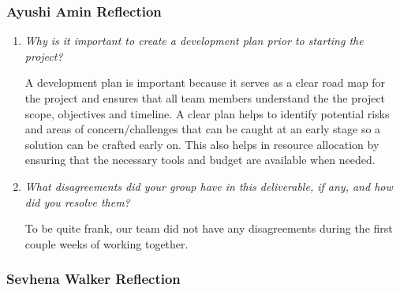 \documentclass{article}
\begin{document}
\subsubsection*{Ayushi Amin Reflection}

\begin{enumerate}
  \item \textit{Why is it important to create a development plan prior to starting the
    project?}

    A development plan is important because it serves as a clear road map for the project and ensures that all 
    team members understand the the project scope, objectives and timeline. A clear plan helps to identify potential risks
    and areas of concern/challenges that can be caught at an early stage so a solution can be crafted early on. This also helps
    in resource allocation by ensuring that the necessary tools and budget are available when needed.

  \item \textit{What disagreements did your group have in this deliverable, if any, and how did you resolve them?}

    To be quite frank, our team did not have any disagreements during the first couple weeks of working together.

\end{enumerate}

\subsubsection*{Sevhena Walker Reflection}
\end{document}
